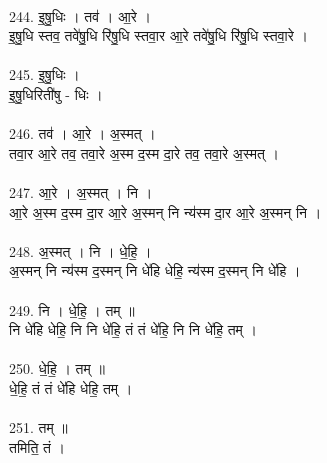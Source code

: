 \\
244. इ॒षु॒धिः । तव॑ । आ॒रे ।\\
इ॒षु॒धि स्तव॒ तवे॑षु॒धि रि॑षु॒धि स्तवा॒र आ॒रे तवे॑षु॒धि रि॑षु॒धि स्तवा॒रे ।\\
\\
245. इ॒षु॒धिः ।\\
इ॒षु॒धिरिती॑षु - धिः ।\\
\\
246. तव॑ । आ॒रे । अ॒स्मत् ।\\
तवा॒र आ॒रे तव॒ तवा॒रे अ॒स्म द॒स्म दा॒रे तव॒ तवा॒रे अ॒स्मत् ।\\
\\
247. आ॒रे । अ॒स्मत् । नि ।\\
आ॒रे अ॒स्म द॒स्म दा॒र आ॒रे अ॒स्मन् नि न्य॑स्म दा॒र आ॒रे अ॒स्मन् नि ।\\
\\
248. अ॒स्मत् । नि । धे॒हि॒ ।\\
अ॒स्मन् नि न्य॑स्म द॒स्मन् नि धे॑हि धेहि॒ न्य॑स्म द॒स्मन् नि धे॑हि ।\\
\\
249. नि । धे॒हि॒ । तम् ॥\\
नि धे॑हि धेहि॒ नि नि धे॑हि॒ तं तं धे॑हि॒ नि नि धे॑हि॒ तम् ।\\
\\
250. धे॒हि॒ । तम् ॥\\
धे॒हि॒ तं तं धे॑हि धेहि॒ तम् ।\\
\\
251. तम् ॥\\
तमिति॒ तं ।\\
